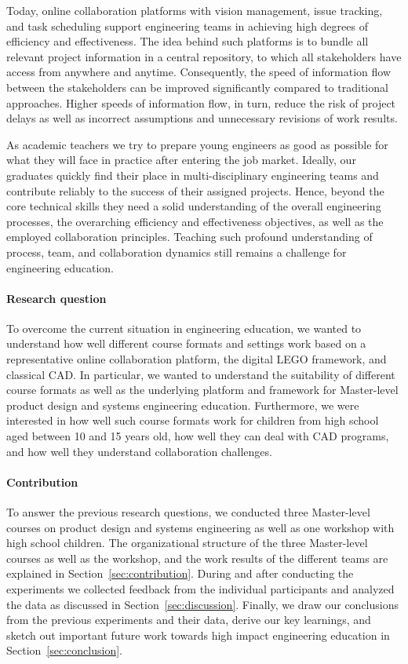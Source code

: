 \documentclass{PDS}
\begin{document}
Today, online collaboration platforms with vision management, issue tracking, and task scheduling support engineering teams in achieving high degrees of efficiency and effectiveness.
The idea behind such platforms is to bundle all relevant project information in a central repository, to which all stakeholders have access from anywhere and anytime.
Consequently, the speed of information flow between the stakeholders can be improved significantly compared to traditional approaches.
Higher speeds of information flow, in turn, reduce the risk of project delays as well as incorrect assumptions and unnecessary revisions of work results.

As academic teachers we try to prepare young engineers as good as possible for what they will face in practice after entering the job market.
Ideally, our graduates quickly find their place in multi-disciplinary engineering teams and contribute reliably to the success of their assigned projects.
Hence, beyond the core technical skills they need a solid understanding of the overall engineering processes, the overarching efficiency and effectiveness objectives, as well as the employed collaboration principles.
Teaching such profound understanding of process, team, and collaboration dynamics still remains a challenge for engineering education.

\paragraph{Research question}

To overcome the current situation in engineering education, we wanted to understand how well different course formats and settings work based on a representative online collaboration platform, the digital LEGO framework, and classical CAD.
In particular, we wanted to understand the suitability of different course formats as well as the underlying platform and framework for Master-level product design and systems engineering education.
Furthermore, we were interested in how well such course formats work for children from high school aged between 10 and 15 years old, how well they can deal with CAD programs, and how well they understand collaboration challenges.

\paragraph{Contribution}

To answer the previous research questions, we conducted three Master-level courses on product design and systems engineering as well as one workshop with high school children.
The organizational structure of the three Master-level courses as well as the workshop, and the work results of the different teams are explained in Section~\ref{sec:contribution}.
During and after conducting the experiments we collected feedback from the individual participants and analyzed the data as discussed in Section~\ref{sec:discussion}.
Finally, we draw our conclusions from the previous experiments and their data, derive our key learnings, and sketch out important future work towards high impact engineering education in Section~\ref{sec:conclusion}.
\end{document}
